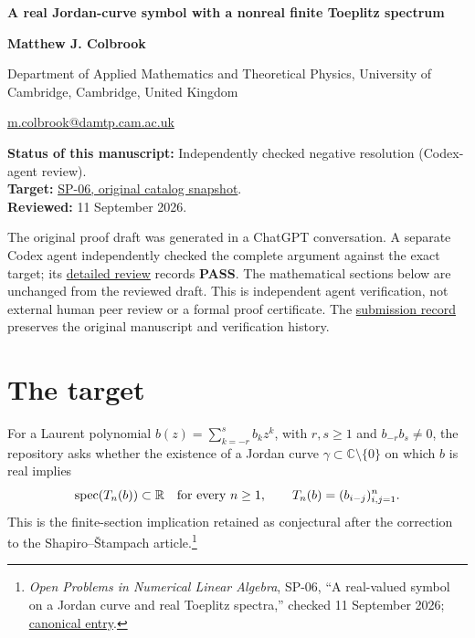 \documentclass[10pt,a4paper]{article}
\begin{document}
{\raggedright\Large\bfseries A real Jordan-curve symbol with a nonreal
finite Toeplitz spectrum\par}
\vspace{0.4em}
{\normalsize\bfseries Matthew J. Colbrook\par}
{\small Department of Applied Mathematics and Theoretical Physics,
University of Cambridge, Cambridge, United Kingdom\par}
{\small\href{mailto:m.colbrook@damtp.cam.ac.uk}{m.colbrook@damtp.cam.ac.uk}\par}
\vspace{0.6em}
\textbf{Status of this manuscript:} Independently checked negative
resolution (Codex-agent review).\\
\textbf{Target:}
\href{https://github.com/ajt60gaibb/OpenProblemsInNLA/blob/b4123194697bdf6f8f82518c1dd7d6c40a30c2e0/eigenvalues-and-inverse-problems/SP-06/README.md}{SP-06,
original catalog snapshot}.\\
\textbf{Reviewed:} 11 September 2026.

The original proof draft was generated in a ChatGPT conversation. A
separate Codex agent independently checked the complete argument against
the exact target; its
\href{https://github.com/ajt60gaibb/OpenProblemsInNLA/blob/main/references/colbrook-additional-2026-09-11/verification/reviews/SP-06-review.md}{detailed
review} records \textbf{PASS}. The mathematical sections below are
unchanged from the reviewed draft. This is independent agent
verification, not external human peer review or a formal proof
certificate. The
\href{https://github.com/ajt60gaibb/OpenProblemsInNLA/blob/main/references/colbrook-additional-2026-09-11/README.md}{submission
record} preserves the original manuscript and verification history.

\section{The target}\label{the-target}

For a Laurent polynomial \(b(z)=\sum_{k=-r}^s b_kz^k\), with \(r,s\ge1\)
and \(b_{-r}b_s\ne0\), the repository asks whether the existence of a
Jordan curve \(\gamma\subset\mathbb C\setminus\{0\}\) on which \(b\) is
real implies \[
 \operatorname{spec}(T_n(b))\subset\mathbb R
 \quad\hbox{for every }n\ge1,
 \qquad T_n(b)=(b_{i-j})_{i,j=1}^n.
\] This is the finite-section implication retained as conjectural after
the correction to the Shapiro--Štampach article.\footnote{\emph{Open
  Problems in Numerical Linear Algebra}, SP-06, ``A real-valued symbol
  on a Jordan curve and real Toeplitz spectra,'' checked 11 September
  2026;
  \href{https://github.com/ajt60gaibb/OpenProblemsInNLA/blob/main/eigenvalues-and-inverse-problems/SP-06/README.md}{canonical
  entry}.}
\end{document}
